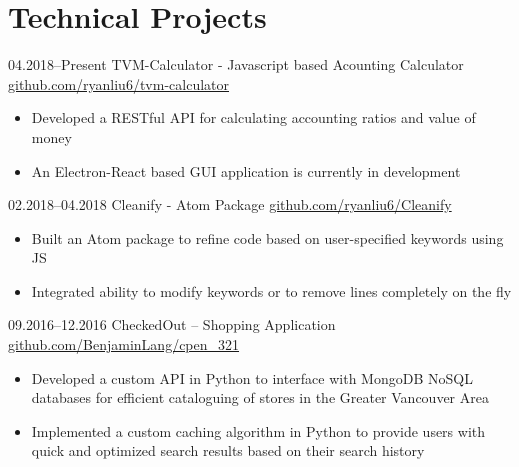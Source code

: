 \documentclass[]{cv-style}          %
\begin{document}

\section{Technical Projects}

\begin{entrylist}
\entry
  {04.2018--Present}
  {TVM-Calculator - Javascript based Acounting Calculator}
  {\href{https://github.com/ryanliu6/tvm-calculator}{github.com/ryanliu6/tvm-calculator}}
  {
  \begin{itemize}[leftmargin=*]
    \item Developed a RESTful API for calculating accounting ratios and value of money 
    \item An Electron-React based GUI application is currently in development
  \end{itemize}}
\entry
  {02.2018--04.2018}
  {Cleanify - Atom Package}
  {\href{https://github.com/ryanliu6/Cleanify}{github.com/ryanliu6/Cleanify}}
  {
  \begin{itemize}[leftmargin=*]
    \item Built an Atom package to refine code based on user-specified keywords using JS
    \item Integrated ability to modify keywords or to remove lines completely on the fly
  \end{itemize}}
\entry
  {09.2016--12.2016}
  {CheckedOut – Shopping Application}
  {\href{https://github.com/BenjaminLang/cpen_321}{github.com/BenjaminLang/cpen\_321}}
  {
  \begin{itemize}[leftmargin=*]
    \item Developed a custom API in Python to interface with MongoDB NoSQL databases for efficient cataloguing of stores in the Greater Vancouver Area
    \item Implemented a custom caching algorithm in Python to provide users with quick and optimized search results based on their search history
  \end{itemize}}

\end{entrylist}
\end{document}
